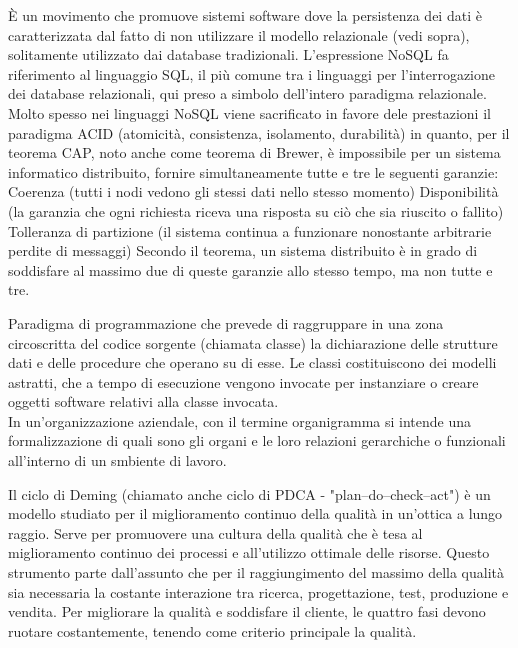 \documentclass{scalatekids-article}
\begin{document}
   È un movimento che promuove sistemi software dove la persistenza dei dati è caratterizzata dal fatto di non utilizzare il modello relazionale (vedi sopra), solitamente utilizzato dai database tradizionali.
  L'espressione NoSQL fa riferimento al linguaggio SQL, il più comune tra i linguaggi per l'interrogazione dei database relazionali, qui preso a simbolo dell'intero paradigma relazionale. Molto spesso nei linguaggi NoSQL viene sacrificato in favore dele prestazioni il paradigma ACID (atomicità, consistenza, isolamento, durabilità) in quanto, per il teorema CAP, noto anche come teorema di Brewer, è impossibile per un sistema informatico distribuito, fornire simultaneamente tutte e tre le seguenti garanzie:
  Coerenza (tutti i nodi vedono gli stessi dati nello stesso momento)
  Disponibilità (la garanzia che ogni richiesta riceva una risposta su ciò che sia riuscito o fallito)
  Tolleranza di partizione (il sistema continua a funzionare nonostante arbitrarie perdite di messaggi)
  Secondo il teorema, un sistema distribuito è in grado di soddisfare al massimo due di queste garanzie allo stesso tempo, ma non tutte e tre.
  \\


   Paradigma di programmazione che prevede di raggruppare in una zona circoscritta del codice sorgente (chiamata classe) la dichiarazione delle strutture dati e delle procedure che operano su di esse. Le classi costituiscono dei modelli astratti, che a tempo di esecuzione vengono invocate per instanziare o creare oggetti software relativi alla classe invocata.
  \\

   In un'organizzazione aziendale, con il termine organigramma si intende una formalizzazione di quali sono gli organi e le loro relazioni gerarchiche o funzionali all'interno di un smbiente di lavoro.
  \\


   Il ciclo di Deming (chiamato anche ciclo di PDCA - "plan–do–check–act") è un modello studiato per il miglioramento continuo della qualità in un'ottica a lungo raggio. Serve per promuovere una cultura della qualità che è tesa al miglioramento continuo dei processi e all'utilizzo ottimale delle risorse. Questo strumento parte dall'assunto che per il raggiungimento del massimo della qualità sia necessaria la costante interazione tra ricerca, progettazione, test, produzione e vendita. Per migliorare la qualità e soddisfare il cliente, le quattro fasi devono ruotare costantemente, tenendo come criterio principale la qualità.
  \\
  
\end{document}
